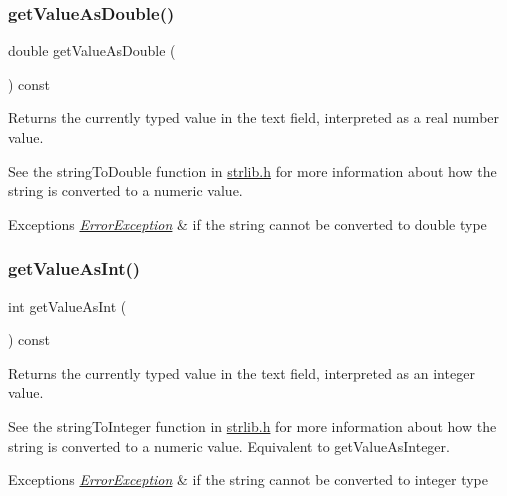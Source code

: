 \subsubsection{\texorpdfstring{get\+Value\+As\+Double()}{getValueAsDouble()}}
{\footnotesize\ttfamily double get\+Value\+As\+Double (\begin{DoxyParamCaption}{ }\end{DoxyParamCaption}) const\hspace{0.3cm}{\ttfamily [virtual]}}



Returns the currently typed value in the text field, interpreted as a real number value. 

See the string\+To\+Double function in \mbox{\hyperlink{strlib_8h_source}{strlib.\+h}} for more information about how the string is converted to a numeric value. 
\begin{DoxyExceptions}{Exceptions}
{\em \mbox{\hyperlink{classErrorException}{Error\+Exception}}} & if the string cannot be converted to double type \\
\hline
\end{DoxyExceptions}
\mbox{\label{classGTextField_a5e50caa202955b726a44a1dfbc6f7818}} 
\subsubsection{\texorpdfstring{get\+Value\+As\+Int()}{getValueAsInt()}}
{\footnotesize\ttfamily int get\+Value\+As\+Int (\begin{DoxyParamCaption}{ }\end{DoxyParamCaption}) const\hspace{0.3cm}{\ttfamily [virtual]}}



Returns the currently typed value in the text field, interpreted as an integer value. 

See the string\+To\+Integer function in \mbox{\hyperlink{strlib_8h_source}{strlib.\+h}} for more information about how the string is converted to a numeric value. Equivalent to get\+Value\+As\+Integer. 
\begin{DoxyExceptions}{Exceptions}
{\em \mbox{\hyperlink{classErrorException}{Error\+Exception}}} & if the string cannot be converted to integer type \\
\hline
\end{DoxyExceptions}
\mbox{\label{classGTextField_a1cbf643145c03ed4c238d085fc88cf33}} 
